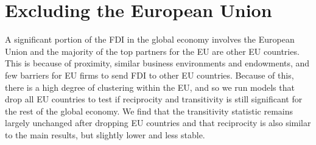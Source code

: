 \documentclass[reqno,onecolumn,letterpaper,12pt]{article}
\begin{document}
{\section{Excluding the European Union}\label{EUresults}

A significant portion of the FDI in the global economy involves the European Union and the majority of the top partners for the EU are other EU countries. This is because of proximity, similar business environments and endowments, and few barriers for EU firms to send FDI to other EU countries. Because of this, there is a high degree of clustering within the EU, and so we run models that drop all EU countries to test if reciprocity and transitivity is still significant for the rest of the global economy. We find that the transitivity statistic remains largely unchanged after dropping EU countries and that reciprocity is also similar to the main results, but slightly lower and less stable. \\



}
\end{document}
